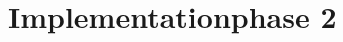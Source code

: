 \documentclass[english,oneside,color]{htldipl}
\begin{document}
\part{Implementationphase 2}






\clearpage
{}

\printbibliography




\end{document}
